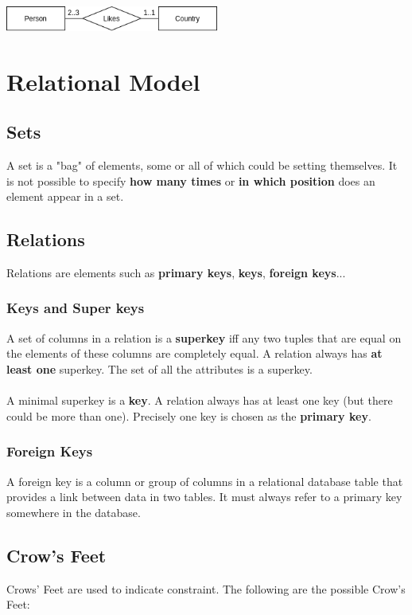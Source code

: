 \documentclass{article}
\begin{document}
\vspace{.6cm}
\centerline{\includegraphics[width=7cm]{./assets/look-across.png}}
\vspace{.2cm}

\section{Relational Model}
\subsection{Sets}
A set is a "bag" of elements, some or all of which could be setting themselves. It is not possible to specify \textbf{how many times} or \textbf{in which position} does an element appear in a set.

\subsection{Relations}
Relations are elements such as \textbf{primary keys}, \textbf{keys}, \textbf{foreign keys}...

\subsubsection{Keys and Super keys}
A set of columns in a relation is a \textbf{superkey} iff any two tuples that are equal on the elements of these columns are completely equal. A relation always has \textbf{at least one} superkey. The set of all the attributes is a superkey. \\ \\
A minimal superkey is a \textbf{key}. A relation always has at least one key (but there could be more than one). Precisely one key is chosen as the \textbf{primary key}.

\subsubsection{Foreign Keys}
A foreign key is a column or group of columns in a relational database table that provides a link between data in two tables. It must always refer to a primary key somewhere in the database.

\subsection{Crow's Feet}
Crows' Feet are used to indicate constraint. The following are the possible Crow's Feet: \\ \\
\end{document}
